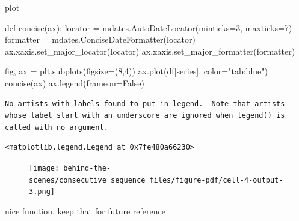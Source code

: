 \documentclass[
  letterpaper,
  DIV=11,
  numbers=noendperiod,
  oneside]{scrreprt}
\newenvironment{Shaded}{\begin{snugshade}}{\end{snugshade}}
\newcommand{\DecValTok}[1]{\textcolor[rgb]{0.68,0.00,0.00}{#1}}
\newcommand{\KeywordTok}[1]{\textcolor[rgb]{0.00,0.23,0.31}{#1}}
\newcommand{\NormalTok}[1]{\textcolor[rgb]{0.00,0.23,0.31}{#1}}
\newcommand{\OperatorTok}[1]{\textcolor[rgb]{0.37,0.37,0.37}{#1}}
\newcommand{\StringTok}[1]{\textcolor[rgb]{0.13,0.47,0.30}{#1}}
\newcommand{\VariableTok}[1]{\textcolor[rgb]{0.07,0.07,0.07}{#1}}
\begin{document}
plot

\begin{Shaded}
\begin{Highlighting}[]
\KeywordTok{def}\NormalTok{ concise(ax):}
\NormalTok{    locator }\OperatorTok{=}\NormalTok{ mdates.AutoDateLocator(minticks}\OperatorTok{=}\DecValTok{3}\NormalTok{, maxticks}\OperatorTok{=}\DecValTok{7}\NormalTok{)}
\NormalTok{    formatter }\OperatorTok{=}\NormalTok{ mdates.ConciseDateFormatter(locator)}
\NormalTok{    ax.xaxis.set\_major\_locator(locator)}
\NormalTok{    ax.xaxis.set\_major\_formatter(formatter)}

\NormalTok{fig, ax }\OperatorTok{=}\NormalTok{ plt.subplots(figsize}\OperatorTok{=}\NormalTok{(}\DecValTok{8}\NormalTok{,}\DecValTok{4}\NormalTok{))}
\NormalTok{ax.plot(df[}\StringTok{\textquotesingle{}series\textquotesingle{}}\NormalTok{], color}\OperatorTok{=}\StringTok{"tab:blue"}\NormalTok{)}
\NormalTok{concise(ax)}
\NormalTok{ax.legend(frameon}\OperatorTok{=}\VariableTok{False}\NormalTok{)}
\end{Highlighting}
\end{Shaded}

\begin{verbatim}
No artists with labels found to put in legend.  Note that artists whose label start with an underscore are ignored when legend() is called with no argument.
\end{verbatim}

\begin{verbatim}
<matplotlib.legend.Legend at 0x7fe480a66230>
\end{verbatim}

\begin{figure}[H]

{\centering \texttt{[image: behind-the-scenes/consecutive\_sequence\_files/figure-pdf/cell-4-output-3.png]}

}

\end{figure}

nice function, keep that for future reference
\end{document}
